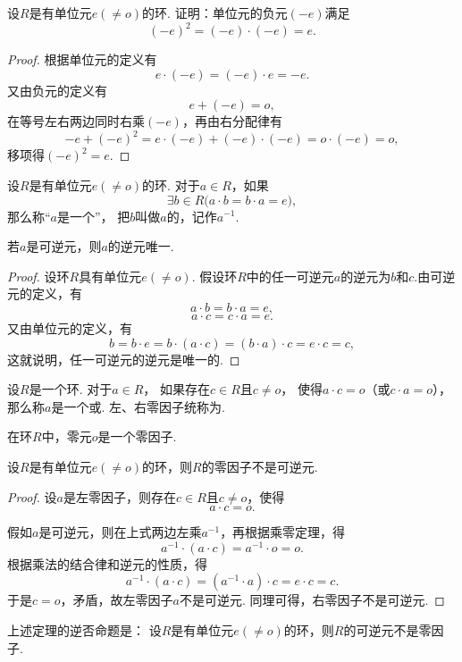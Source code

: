 \begin{example}
设\(R\)是有单位元\(e(\neq o)\)的环.
证明：单位元的负元\((-e)\)满足\[
    (-e)^2=(-e)\cdot(-e)=e.
\]
\begin{proof}
根据单位元的定义有\[
    e \cdot (-e) = (-e) \cdot e = -e.
\]又由负元的定义有\[
    e + (-e) = o,
\]在等号左右两边同时右乘\((-e)\)，再由右分配律有\[
    -e + (-e)^2 = e \cdot (-e) + (-e) \cdot (-e) = o \cdot (-e) = o,
\]
移项得\((-e)^2 = e\).
\end{proof}
\end{example}

\begin{definition}
设\(R\)是有单位元\(e(\neq o)\)的环.
对于\(a \in R\)，如果\[
    \exists b \in R \bigl( a \cdot b = b \cdot a = e \bigr),
\]那么称“\(a\)是一个”，
把\(b\)叫做\(a\)的，记作\(a^{-1}\).
\end{definition}

\begin{property}
若\(a\)是可逆元，则\(a\)的逆元唯一.
\begin{proof}
设环\(R\)具有单位元\(e(\neq o)\).
假设环\(R\)中的任一可逆元\(a\)的逆元为\(b\)和\(c\).由可逆元的定义，有\[
    a \cdot b = b \cdot a = e,
\]\[
    a \cdot c = c \cdot a = e.
\]
又由单位元的定义，有\[
    b = b \cdot e
    = b \cdot (a \cdot c)
    = (b \cdot a) \cdot c
    = e \cdot c
    = c,
\]
这就说明，任一可逆元的逆元是唯一的.
\end{proof}
\end{property}

\begin{definition}
设\(R\)是一个环.
对于\(a \in R\)，
如果存在\(c \in R\)且\(c \neq o\)，
使得\(a \cdot c = o\)（或\(c \cdot a = o\)），
那么称\(a\)是一个或.
左、右零因子统称为.
\end{definition}

\begin{property}
在环\(R\)中，零元\(o\)是一个零因子.
\end{property}

\begin{theorem}
设\(R\)是有单位元\(e(\neq o)\)的环，则\(R\)的零因子不是可逆元.
\begin{proof}
设\(a\)是左零因子，则存在\(c \in R\)且\(c \neq o\)，使得\[
    a \cdot c = o.
\]

假如\(a\)是可逆元，则在上式两边左乘\(a^{-1}\)，再根据乘零定理，得\[
    a^{-1} \cdot (a \cdot c) = a^{-1} \cdot o = o.
\]
根据乘法的结合律和逆元的性质，得\[
    a^{-1} \cdot (a \cdot c) = (a^{-1} \cdot a) \cdot c = e \cdot c = c.
\]
于是\(c = o\)，矛盾，故左零因子\(a\)不是可逆元.
同理可得，右零因子不是可逆元.
\end{proof}
\end{theorem}
上述定理的逆否命题是：
设\(R\)是有单位元\(e(\neq o)\)的环，则\(R\)的可逆元不是零因子.

